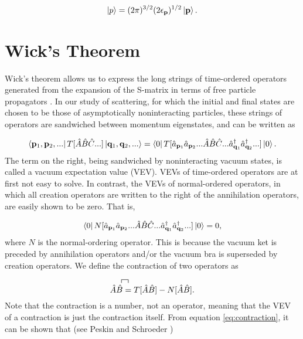\documentclass{article}
\begin{document}
\begin{equation}
\label{eq:normalization}
    \ket{p} = (2\pi)^{3/2}(2\epsilon_\mathbf{p})^{1/2}\ket{\mathbf{p}}.
\end{equation}

\section{Wick's Theorem}
\label{app:wicks}

Wick's theorem allows us to express the long strings of time-ordered operators generated from the expansion of the S-matrix in terms of free particle propagators \cite{Lancaster2014, Peskin1995}.  In our study of scattering, for which the initial and final states are chosen to be those of asymptotically noninteracting particles, these strings of operators are sandwiched between momentum eigenstates, and can be written as

\begin{equation}
    \bra{\mathbf{p}_1, \mathbf{p}_2, ...}
    T[\hat{A}\hat{B}\hat{C}...]
    \ket{\mathbf{q}_1, \mathbf{q}_2, ...}
    =
    \bra{0}
    T[
    \hat{a}_{\mathbf{p}_1}
    \hat{a}_{\mathbf{p}_2}
    ...
    \hat{A}\hat{B}\hat{C}...
    \hat{a}_{\mathbf{q}_1}^\dag
    \hat{a}_{\mathbf{q}_2}^\dag
    ...
    ]
    \ket{0}.
\end{equation}
%
The term on the right, being sandwiched by noninteracting vacuum states, is called a vacuum expectation value (VEV).  VEVs of time-ordered operators are at first not easy to solve.  In contrast, the VEVs of normal-ordered operators, in which all creation operators are written to the right of the annihilation operators, are easily shown to be zero. That is,

\begin{equation}
    \bra{0}
    N[
    \hat{a}_{\mathbf{p}_1}
    \hat{a}_{\mathbf{p}_2}
    ...
    \hat{A}\hat{B}\hat{C}...
    \hat{a}_{\mathbf{q}_1}^\dag
    \hat{a}_{\mathbf{q}_2}^\dag
    ...
    ]
    \ket{0}
    =
    0,
\end{equation}
%
where $N$ is the normal-ordering operator.
This is because the vacuum ket is preceded by annihilation operators and/or the vacuum bra is superseded by creation operators.  We define the contraction of two operators as 

\begin{equation}
    \label{eq:contraction}
    \contraction[1ex]
        {}{\hat{A}}{}{B}
        \hat{A}\hat{B}
    =
    T[\hat{A}\hat{B}]
    -
    N[\hat{A}\hat{B}].
\end{equation}
%
Note that the contraction is a number, not an operator, meaning that the VEV of a contraction is just the contraction itself.
From equation \ref{eq:contraction}, it can be shown that (see Peskin and Schroeder \cite{Peskin1995})
\end{document}
